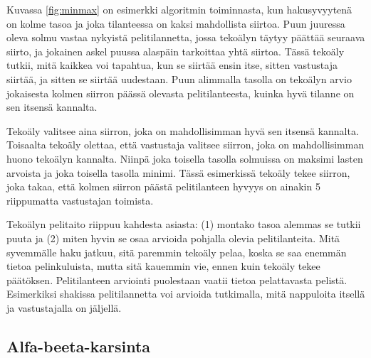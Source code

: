 Kuvassa \ref{fig:minmax} on esimerkki algoritmin toiminnasta,
kun hakusyvyytenä on kolme tasoa ja
joka tilanteessa on kaksi mahdollista siirtoa.
Puun juuressa oleva solmu vastaa nykyistä pelitilannetta,
jossa tekoälyn täytyy päättää seuraava siirto,
ja jokainen askel puussa alaspäin tarkoittaa yhtä siirtoa.
Tässä tekoäly tutkii, mitä kaikkea voi tapahtua,
kun se siirtää ensin itse, sitten vastustaja siirtää,
ja sitten se siirtää uudestaan.
Puun alimmalla tasolla on tekoälyn arvio jokaisesta
kolmen siirron päässä olevasta pelitilanteesta,
kuinka hyvä tilanne on sen itsensä kannalta.

Tekoäly valitsee aina siirron,
joka on mahdollisimman hyvä sen itsensä kannalta.
Toisaalta tekoäly olettaa, että vastustaja valitsee siirron,
joka on mahdollisimman huono tekoälyn kannalta.
Niinpä joka toisella tasolla solmuissa on maksimi lasten arvoista
ja joka toisella tasolla minimi.
Tässä esimerkissä tekoäly tekee siirron,
joka takaa, että kolmen siirron päästä pelitilanteen hyvyys on ainakin 5
riippumatta vastustajan toimista.

Tekoälyn pelitaito riippuu kahdesta asiasta:
(1) montako tasoa alemmas se tutkii puuta ja
(2) miten hyvin se osaa arvioida pohjalla olevia pelitilanteita.
Mitä syvemmälle haku jatkuu, sitä paremmin tekoäly pelaa,
koska se saa enemmän tietoa pelinkuluista,
mutta sitä kauemmin vie, ennen kuin tekoäly tekee päätöksen.
Pelitilanteen arviointi puolestaan vaatii tietoa pelattavasta pelistä.
Esimerkiksi shakissa pelitilannetta voi arvioida tutkimalla,
mitä nappuloita itsellä ja vastustajalla on jäljellä.

\subsection{Alfa-beeta-karsinta}

